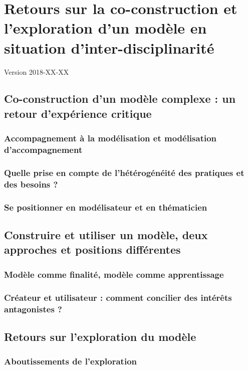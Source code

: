 \chapter{Retours sur la co-construction et l'exploration d'un modèle en situation d'inter-disciplinarité}
\label{chap:chap8}
\begin{center}
	{\large Version 2018-XX-XX}
\end{center}
\minitoc

\section{Co-construction d'un modèle complexe : un retour d'expérience critique}
\subsection{Accompagnement à la modélisation et modélisation d'accompagnement}
\subsection{Quelle prise en compte de l'hétérogénéité des pratiques et des besoins ?}
\subsection{Se positionner en modélisateur et en thématicien}

\section{Construire et utiliser un modèle, deux approches et positions différentes}
\subsection{Modèle comme finalité, modèle comme apprentissage}
\subsection{Créateur et utilisateur : comment concilier des intérêts antagonistes ?}

\section{Retours sur l'exploration du modèle}
\subsection{Aboutissements de l'exploration}
